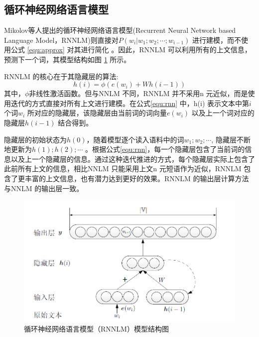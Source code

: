 \documentclass[12pt,a4paper]{article}
\begin{document}
\subsection{循环神经网络语言模型}
\label{sec:rnnlm}

Mikolov等人提出的循环神经网络语言模型(Recurrent Neural Network based Language Model，RNNLM)则直接对$P(w_i | w_1;w_2;\cdots;w_{i-1}) $ 进行建模，而不使用公式 \ref{equ:approx} 对其进行简化\cite{mikolov2012statistical,DBLP:conf/interspeech/MikolovKBCK10} 。因此，RNNLM 可以利用所有的上文信息，预测下一个词，其模型结构如图 \ref{fig:rnnlm} 所示。

RNNLM 的核心在于其隐藏层的算法:
\begin{equation}
\label{equ:rnn}
h(i) =\phi(e(w_i) +Wh(i -1))
\end{equation}
其中，$\phi$非线性激活函数。但与NNLM 不同，RNNLM 并不采用n 元近似，而是使用迭代的方式直接对所有上文进行建模。在公式\ref{equ:rnn} 中，h(i) 表示文本中第$i$ 个词$w_i$ 所对应的隐藏层，该隐藏层由当前词的词向量$e(w_i)$ 以及上一个词对应的隐藏层$h(i -1)$ 结合得到。

隐藏层的初始状态为$h(0)$，随着模型逐个读入语料中的词$w_1;w_2; \cdots $, 隐藏层不断地更新为$h(1);h(2); \cdots$ 。根据公式\ref{equ:rnn}，每一个隐藏层包含了当前词的信息以及上一个隐藏层的信息。通过这种迭代推进的方式，每个隐藏层实际上包含了此前所有上文的信息，相比NNLM 只能采用上文n 元短语作为近似，RNNLM 包含了更丰富的上文信息，也有潜力达到更好的效果。RNNLM 的输出层计算方法与NNLM 的输出层一致。
\begin{figure}[!h]
  \centering
  \includegraphics[width=0.85\linewidth]{./figures/rnnlm.png}
  \caption{循环神经网络语言模型（RNNLM）模型结构图}\label{fig:rnnlm}
\end{figure}
\end{document}
